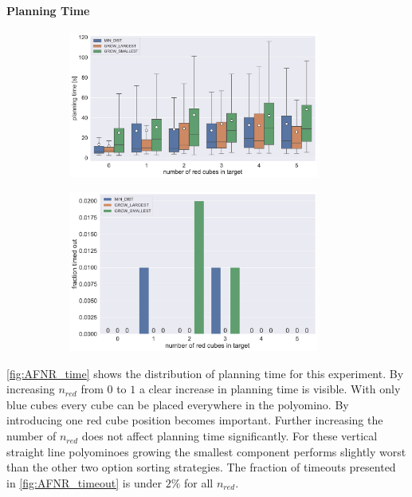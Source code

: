\paragraph{Planning Time}

\begin{figure}
	\centering
	\begin{subfigure}[b]{\textwidth}
		\centering
		\includegraphics[width=0.9\textwidth]{figures/plots/AFNR_time.pdf}
		\caption{}
		\label{fig:AFNR_time}
	\end{subfigure}
	
	\begin{subfigure}[b]{\textwidth}
		\centering
		\includegraphics[width=0.9\textwidth]{figures/plots/AFNR_timeout.pdf}
		\caption{}
		\label{fig:AFNR_timeout}
	\end{subfigure}
	\caption[]{}
	\label{fig:AFNR_timestats}
\end{figure}

\autoref{fig:AFNR_time} shows the distribution of planning time for this experiment.
By increasing $n_\textit{red}$ from $0$ to $1$ a clear increase in planning time is visible.
With only blue cubes every cube can be placed everywhere in the polyomino.
By introducing one red cube position becomes important.
Further increasing the number of $n_\textit{red}$ does not affect planning time significantly.
For these vertical straight line polyominoes growing the smallest component performs slightly worst than the other two option sorting strategies.
The fraction of timeouts presented in \autoref{fig:AFNR_timeout} is under $2\%$ for all $n_\textit{red}$. 




